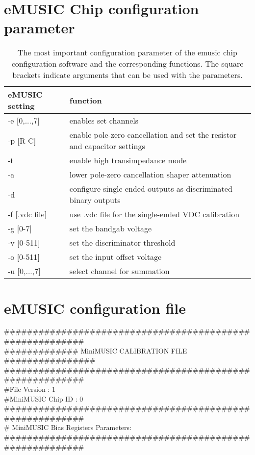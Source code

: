 \section*{eMUSIC Chip configuration parameter}
\begin{table}
	\centering
	\caption[eMUSCI configuration parameter]{The most important configuration parameter of the \ac{emusic} chip configuration software and the corresponding functions. The square brackets indicate arguments that can be used with the parameters.}
	\label{tab:emusic_config}
	\begin{tabularx}{\textwidth}{X|X}\toprule
		eMUSIC setting & function \\\midrule
		-e [0,...,7] & enables set channels \\ 
		-p [R C] & enable pole-zero cancellation and set the resistor and capacitor settings \\ 
		-t & enable high transimpedance mode \\ 
		-a & lower pole-zero cancellation shaper attenuation \\ 
		-d & configure single-ended outputs as discriminated binary outputs \\ 
		-f [.vdc file] & use .vdc file for the single-ended VDC calibration \\ 
		-g [0-7] & set the bandgab voltage \\ 
		-v [0-511] & set the discriminator threshold \\ 
		-o [0-511] & set the input offset voltage \\
		-u [0,...,7] & select channel for summation \\ 
		\bottomrule
	\end{tabularx}
\end{table}

\section*{eMUSIC configuration file}

#########################################################\\
#############   MiniMUSIC CALIBRATION FILE   ################\\
#########################################################\\

#File Version     : 1\\
#MiniMUSIC Chip ID    : 0\\

#########################################################\\
# MiniMUSIC Bias Registers Parameters:\\
#########################################################\\

